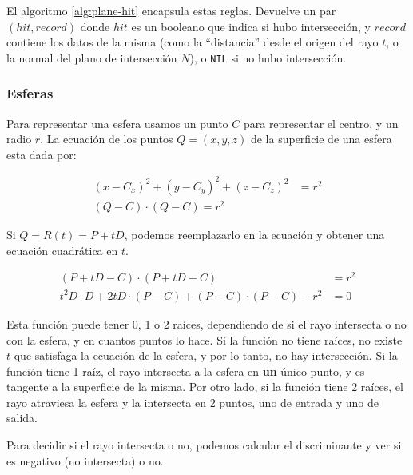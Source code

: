 El algoritmo \ref{alg:plane-hit} encapsula estas reglas. Devuelve un par $(hit,
record)$ donde $hit$ es un booleano que indica si hubo intersección, y $record$
contiene los datos de la misma (como la ``distancia'' desde el origen del rayo
$t$, o la normal del plano de intersección $N$), o \texttt{NIL} si no hubo
intersección.

\subsubsection{Esferas}

Para representar una esfera usamos un punto $C$ para representar el centro, y un
radio $r$. La ecuación de los puntos $Q=(x, y, z)$ de la superficie de una
esfera esta dada por:

\begin{align*}
    (x - C_x)^2 + (y - C_y)^2 + (z - C_z)^2 &= r^2 \\
    (Q - C) \cdot (Q - C) = r^2
\end{align*}

Si $Q = R(t) = P + tD$, podemos reemplazarlo en la ecuación y obtener una
ecuación cuadrática en $t$.

\begin{align*}
    (P + tD - C) \cdot (P + tD - C) &= r^2 \\
    t^2 D \cdot D + 2tD \cdot (P - C) + (P - C) \cdot (P - C) - r^2 &= 0
    \label{eq:cuad-esfera}
\end{align*}

Esta función puede tener 0, 1 o 2 raíces, dependiendo de si el rayo intersecta o
no con la esfera, y en cuantos puntos lo hace. Si la función no tiene raíces, no
existe $t$ que satisfaga la ecuación de la esfera, y por lo tanto, no hay
intersección. Si la función tiene 1 raíz, el rayo intersecta a la esfera en
\textbf{un} único punto, y es tangente a la superficie de la misma. Por otro
lado, si la función tiene 2 raíces, el rayo atraviesa la esfera y la intersecta
en 2 puntos, uno de entrada y uno de salida.


Para decidir si el rayo intersecta o no, podemos calcular el discriminante y ver
si es negativo (no intersecta) o no.

